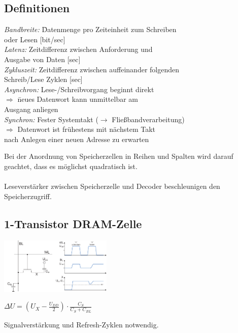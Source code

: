 \documentclass[a4paper,twocolumn,10pt]{article}
\begin{document}
\subsection*{Definitionen}
\begin{tabbing}
\textit{Bandbreite:} \= Datenmenge pro Zeiteinheit zum Schreiben \\
\> oder Lesen [bit/sec]\\
\textit{Latenz:} \> Zeitdifferenz zwischen Anforderung und \\
\> Ausgabe von Daten [sec]\\
\textit{Zykluszeit:} \> Zeitdifferenz zwischen auffeinander folgenden \\
\> Schreib/Lese Zyklen [sec]\\
\textit{Asynchron:} \> Lese-/Schreibvorgang beginnt direkt \\
\> $\Rightarrow$ \= neues Datenwort kann unmittelbar am \\
\> \> Ausgang anliegen\\
\textit{Synchron:} \> Fester Systemtakt ($\rightarrow$ Fließbandverarbeitung)\\
\> $\Rightarrow$ Datenwort ist frühestens mit nächstem Takt \\
\> \> nach Anlegen einer neuen Adresse zu erwarten \\
\end{tabbing}
Bei der Anordnung von Speicherzellen in Reihen und Spalten wird darauf geachtet, dass es möglichst quadratisch ist.\\\\
Leseverstärker zwischen Speicherzelle und Decoder beschleunigen den Speicherzugriff.

\subsection*{1-Transistor DRAM-Zelle}
\includegraphics[width=0.4\textwidth]{Grafiken/1-Transistor-DRAM}
\begin{flushright}
$\Delta U=(U_X-\frac{U_{DD}}{2})\cdot \frac{C_S}{C_S+C_{BL}}$
\end{flushright}
Signalverstärkung und Refresh-Zyklen notwendig.
\end{document}

